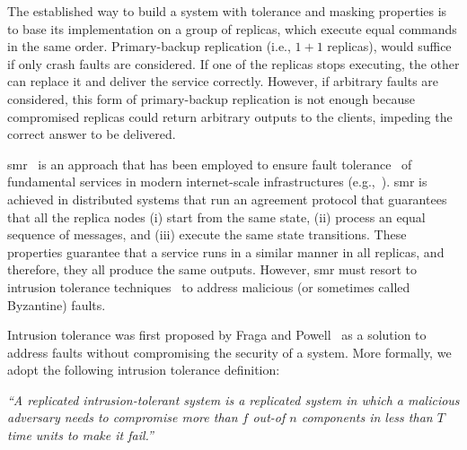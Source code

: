 The established way to build a system with tolerance and masking properties is to base its implementation on a group of replicas, which execute equal commands in the same order. 
Primary-backup replication (i.e., $1 + 1$ replicas), would suffice if only crash faults are considered. 
If one of the replicas stops executing, the other can replace it and deliver the service correctly.
However, if arbitrary faults are considered, this form of primary-backup replication is not enough because compromised replicas could return arbitrary outputs to the clients, impeding the correct answer to be delivered.

\gls{smr}~\cite{Lamport:1984} is an approach that has been employed to ensure fault tolerance~\cite{Schneider:1990} of fundamental services in modern internet-scale infrastructures (e.g.,~\cite{Hunt:2010,Calder:2011,Corbett:2013}).
\gls{smr} is achieved in distributed systems that run an agreement protocol that guarantees that all the replica nodes (i) start from the same state, (ii) process an equal sequence of messages, and (iii) execute the same state transitions. 
These properties guarantee that a service runs in a similar manner in all replicas, and therefore, they all produce the same outputs.
However, \gls{smr} must resort to intrusion tolerance techniques~\cite{Verissimo:2003} to address malicious (or sometimes called Byzantine) faults.

Intrusion tolerance was first proposed by Fraga and Powell~\cite{Fraga:1985} as a solution to address faults without compromising the security of a system. 
More formally, we adopt the following intrusion tolerance definition: 

\begin{defn}
\emph{``A replicated intrusion-tolerant system is a replicated system in which a malicious adversary needs to compromise more than $f$ out-of $n$ components in less than $T$ time units to make it fail.''}~\cite{Bessani:2011}
\label{def:def2}
\end{defn}

